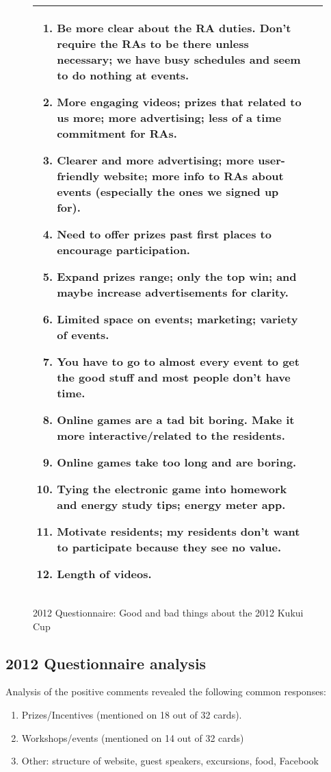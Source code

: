 \documentclass[]{IEEEconf}
\begin{document}
\begin{figure*}[th!]
\begin{tabular}{|l|l|}
\begin{minipage}[t]{4.0in}
\begin{enumerate}
\item 	Be more clear about the RA duties.  Don't require the RAs to be there unless necessary; we have busy schedules and seem to do nothing at events.
\item 	More engaging videos; prizes that related to us more; more advertising; less of a time commitment for RAs.
\item 	Clearer and more advertising; more user-friendly website; more info to RAs about events (especially the ones we signed up for).
\item 	Need to offer prizes past first places to encourage participation.
\item 	Expand prizes range; only the top win; and maybe increase advertisements for clarity.
\item 	Limited space on events; marketing; variety of events.
\item 	You have to go to almost every event to get the good stuff and most people don't have time.
\item 	Online games are a tad bit boring.  Make it more interactive/related to the residents.
\item 	Online games take too long and are boring.
\item 	Tying the electronic game into homework and energy study tips; energy meter app.
\item 	Motivate residents; my residents don't want to participate because they see no value.
\item 	Length of videos. 
\end{enumerate}
\end{minipage}  \normalsize
\\
\hline
\end{tabular}
\caption{2012 Questionnaire: Good and bad things about the 2012 Kukui Cup}
\label{fig:2012-questionnaire-results}
\end{figure*}

\subsection{2012 Questionnaire analysis}

Analysis of the positive comments revealed the following common responses:

\begin{enumerate}[noitemsep]
\item Prizes/Incentives (mentioned on 18 out of 32 cards).
\item Workshops/events (mentioned on 14 out of 32 cards)
\item Other: structure of website, guest speakers, excursions, food, Facebook
\end{enumerate}
\end{document}
